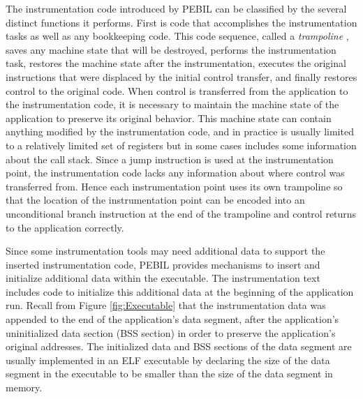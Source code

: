 The instrumentation code introduced by PEBIL can be classified by the several
distinct functions it performs. First is code that accomplishes the
instrumentation tasks as well as any bookkeeping code. This code sequence,
called a \textit{trampoline} \cite{buck2000api}, saves any machine state that
will be destroyed, performs the instrumentation task, restores the machine state
after the instrumentation, executes the original instructions that were
displaced by the initial control transfer, and finally restores control to the
original code. When control is transferred from the application to the
instrumentation code, it is necessary to maintain the machine state of the
application to preserve its original behavior. This machine state can contain
anything modified by the instrumentation code, and in practice is usually
limited to a relatively limited set of registers but in some cases includes some
information about the call stack. Since a jump instruction is used at the
instrumentation point, the instrumentation code lacks any information about
where control was transferred from. Hence each instrumentation point uses its
own trampoline so that the location of the instrumentation point can be encoded
into an unconditional branch instruction at the end of the trampoline and
control returns to the application correctly.

Since some instrumentation tools may need additional data to support the
inserted instrumentation code, PEBIL provides mechanisms to insert and
initialize additional data within the executable. The instrumentation text
includes code to initialize this additional data at the beginning of the
application run. Recall from Figure
\ref{fig:Executable} that the instrumentation data was appended to the end of
the application's data segment, after the application's uninitialized data
section (BSS section) in order to preserve the application's original addresses.
The initialized data and BSS sections of the data segment are usually
implemented in an ELF executable by declaring the size of the data segment in
the executable to be smaller than the size of the data segment in memory. 

